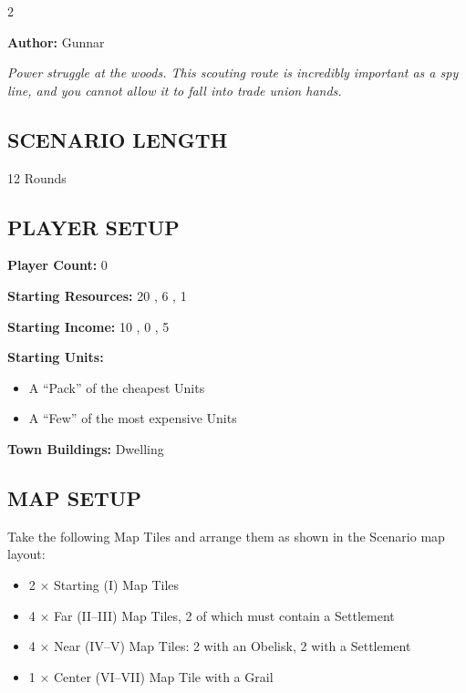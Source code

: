 
\begin{multicols*}{2}

\textbf{Author:} Gunnar

\textit{Power struggle at the woods. This scouting route is incredibly important as a spy line, and you cannot allow it to fall into trade union hands.}

\subsection*{\MakeUppercase{Scenario Length}}
12 Rounds

\subsection*{\MakeUppercase{Player Setup}}
\textbf{Player Count:} 0

\textbf{Starting Resources:} 20 , 6 , 1 

\textbf{Starting Income:} 10 , 0 , 5 

\textbf{Starting Units:}

\begin{itemize}
  \item A ``Pack'' of the cheapest  Units
  \item A ``Few'' of the most expensive  Units
\end{itemize}

\textbf{Town Buildings:}  Dwelling

\subsection*{\MakeUppercase{Map Setup}}

Take the following Map Tiles and arrange them as shown in the Scenario map layout:

\begin{itemize}
  \item 2 × Starting (I) Map Tiles
  \item 4 × Far (II--III) Map Tiles, 2 of which must contain a Settlement
  \item 4 × Near (IV--V) Map Tiles: 2 with an Obelisk, 2 with a Settlement
  \item 1 × Center (VI--VII) Map Tile with a Grail
\end{itemize}


\end{multicols*}
